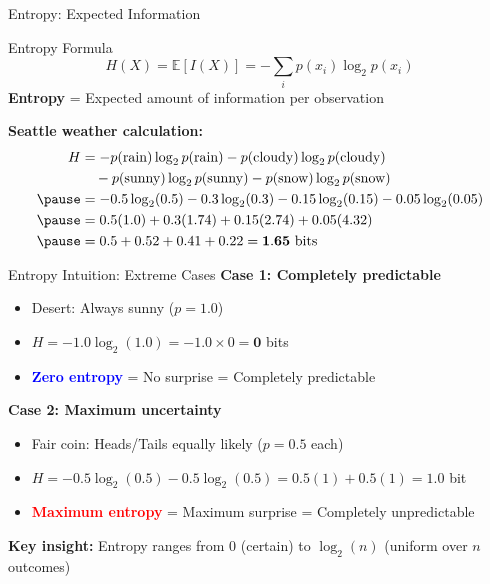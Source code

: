 \documentclass[usenames,dvipsnames]{beamer}
\begin{document}
\begin{frame}{Entropy: Expected Information}
\begin{definitionbox}{Entropy Formula}
$$H(X) = \mathbb{E}[I(X)] = -\sum_{i} p(x_i) \log_2 p(x_i)$$
\textbf{Entropy} = Expected amount of information per observation
\end{definitionbox}

\pause
\textbf{Seattle weather calculation:}
\begin{align}
H &= -p(\text{rain}) \log_2 p(\text{rain}) - p(\text{cloudy}) \log_2 p(\text{cloudy}) \\
&\quad - p(\text{sunny}) \log_2 p(\text{sunny}) - p(\text{snow}) \log_2 p(\text{snow})\\
\pause
&= -0.5 \log_2(0.5) - 0.3 \log_2(0.3) - 0.15 \log_2(0.15) - 0.05 \log_2(0.05)\\
\pause  
&= 0.5(1.0) + 0.3(1.74) + 0.15(2.74) + 0.05(4.32)\\
\pause
&= 0.5 + 0.52 + 0.41 + 0.22 = \mathbf{1.65} \text{ bits}
\end{align}
\end{frame}

\begin{frame}{Entropy Intuition: Extreme Cases}
\textbf{Case 1: Completely predictable}
\begin{itemize}
\item Desert: Always sunny ($p = 1.0$)
\pause
\item $H = -1.0 \log_2(1.0) = -1.0 \times 0 = \mathbf{0}$ bits
\pause
\item \textcolor{blue}{\textbf{Zero entropy}} = No surprise = Completely predictable
\end{itemize}

\pause
\textbf{Case 2: Maximum uncertainty}  
\begin{itemize}
\item Fair coin: Heads/Tails equally likely ($p = 0.5$ each)
\pause
\item $H = -0.5 \log_2(0.5) - 0.5 \log_2(0.5) = 0.5(1) + 0.5(1) = \mathbf{1.0}$ bit
\pause
\item \textcolor{red}{\textbf{Maximum entropy}} = Maximum surprise = Completely unpredictable
\end{itemize}

\pause
\textbf{Key insight:} Entropy ranges from 0 (certain) to $\log_2(n)$ (uniform over $n$ outcomes)
\end{frame}
\end{document}
